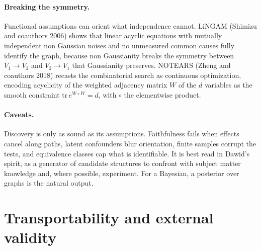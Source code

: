 \paragraph{Breaking the symmetry.} Functional assumptions can orient what independence cannot. LiNGAM (Shimizu and coauthors 2006) shows that linear acyclic equations with mutually independent non Gaussian noises and no unmeasured common causes fully identify the graph, because non Gaussianity breaks the symmetry between $V_1\to V_2$ and $V_2\to V_1$ that Gaussianity preserves. NOTEARS (Zheng and coauthors 2018) recasts the combinatorial search as continuous optimization, encoding acyclicity of the weighted adjacency matrix $W$ of the $d$ variables as the smooth constraint $\mathrm{tr}\,e^{W\circ W}=d$, with $\circ$ the elementwise product.

\paragraph{Caveats.} Discovery is only as sound as its assumptions. Faithfulness fails when effects cancel along paths, latent confounders blur orientation, finite samples corrupt the tests, and equivalence classes cap what is identifiable. It is best read in Dawid's spirit, as a generator of candidate structures to confront with subject matter knowledge and, where possible, experiment. For a Bayesian, a posterior over graphs is the natural output.

\section{Transportability and external validity}\label{fw:sec:transport}

